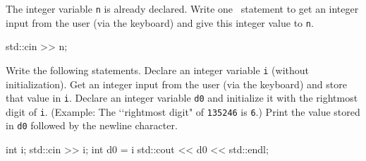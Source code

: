 \nextq
The integer variable \verb!n! is already declared.
Write one \cpp\ statement to get an integer input from the
user (via the keyboard) and give this integer value to \verb!n!.
\\
\ANSWER
\begin{answercode}
std::cin >> n;
\end{answercode}

\nextq
Write the following statements.
Declare an integer variable \verb!i! (without initialization).
Get an integer input from the user (via the keyboard) and store that
value in \verb!i!.
Declare an integer variable \verb!d0!
and initialize it with the rightmost digit of \verb!i!.
(Example: The \lq\lq rightmost digit" of \verb!135246! is \verb!6!.)
Print the value stored in \verb!d0! followed by the newline character.
\\
\ANSWER
\begin{answercode}
int i;
std::cin >> i;
int d0 = i %
std::cout << d0 << std::endl;
\end{answercode}


